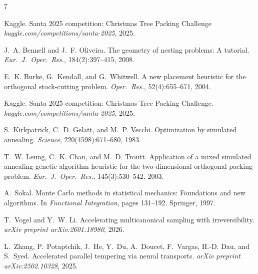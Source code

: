 \documentclass[10pt,twocolumn]{article}
\begin{document}

\begin{thebibliography}{7}

            Kaggle.
            Santa 2025 competition: Christmas Tree Packing Challenge
\textit{kaggle.com/competitions/santa-2025}, 2025.


J.~A. Bennell and J.~F. Oliveira.
The geometry of nesting problems: A tutorial.
\textit{Eur.\ J.\ Oper.\ Res.}, 184(2):397--415, 2008.

E.~K. Burke, G.~Kendall, and G.~Whitwell.
A new placement heuristic for the orthogonal stock-cutting problem.
\textit{Oper.\ Res.}, 52(4):655--671, 2004.

Kaggle.
Santa 2025 competition: Christmas Tree Packing Challenge.
\textit{kaggle.com/competitions/santa-2025}, 2025.

S.~Kirkpatrick, C.~D. Gelatt, and M.~P. Vecchi.
Optimization by simulated annealing.
\textit{Science}, 220(4598):671--680, 1983.

T.~W. Leung, C.~K. Chan, and M.~D. Troutt.
Application of a mixed simulated annealing-genetic algorithm heuristic
for the two-dimensional orthogonal packing problem.
\textit{Eur.\ J.\ Oper.\ Res.}, 145(3):530--542, 2003.

A.~Sokal.
Monte Carlo methods in statistical mechanics: Foundations and new algorithms.
In \textit{Functional Integration}, pages 131--192. Springer, 1997.

T.~Vogel and Y.~W. Li.
Accelerating multicanonical sampling with irreversibility.
\textit{arXiv preprint arXiv:2601.18980}, 2026.

L.~Zhang, P.~Potaptchik, J.~He, Y.~Du, A.~Doucet, F.~Vargas, H.-D. Dau, and S.~Syed.
Accelerated parallel tempering via neural transports.
\textit{arXiv preprint arXiv:2502.10328}, 2025.

\end{thebibliography}

\clearpage
\end{document}
